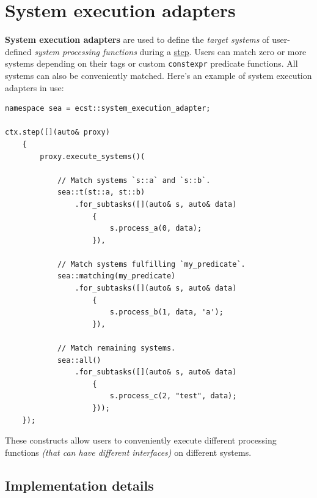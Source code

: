 \documentclass[twoside, 12pt, a4paper, openany]{book}
\begin{document}
\section{System execution adapters}\label{system-execution-adapters}

\textbf{System execution adapters} are used to define the \emph{target
systems} of user-defined \emph{system processing functions} during a
\protect\hyperlink{step_stage}{step}. Users can match zero or more
systems depending on their tags or custom
\texttt{constexpr}
predicate functions. All systems can also be conveniently matched.
Here's an example of system execution adapters in use:

\begin{verbatim}
namespace sea = ecst::system_execution_adapter;

ctx.step([](auto& proxy)
    {
        proxy.execute_systems()(

            // Match systems `s::a` and `s::b`.
            sea::t(st::a, st::b)
                .for_subtasks([](auto& s, auto& data)
                    {
                        s.process_a(0, data);
                    }),

            // Match systems fulfilling `my_predicate`.
            sea::matching(my_predicate)
                .for_subtasks([](auto& s, auto& data)
                    {
                        s.process_b(1, data, 'a');
                    }),

            // Match remaining systems.
            sea::all()
                .for_subtasks([](auto& s, auto& data)
                    {
                        s.process_c(2, "test", data);
                    }));
    });
\end{verbatim}

These constructs allow users to conveniently execute different
processing functions \emph{(that can have different interfaces)} on
different systems.

\subsection{Implementation details}\label{implementation-details-2}
\end{document}
